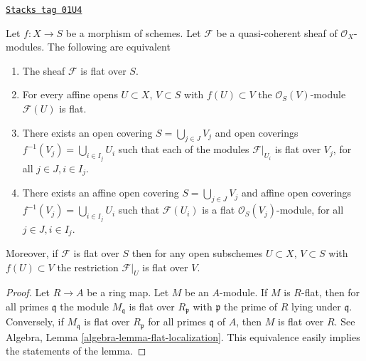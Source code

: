 \begin{lemma}
\label{morphisms-lemma-flat-module-characterize}
\href{https://stacks.math.columbia.edu/tag/01U4}{\texttt{Stacks tag 01U4}}

Let $f : X \to S$ be a morphism of schemes.
Let $\mathcal{F}$ be a quasi-coherent sheaf of $\mathcal{O}_X$-modules.
The following are equivalent
\begin{enumerate}
\item The sheaf $\mathcal{F}$ is flat over $S$.
\item For every affine opens $U \subset X$, $V \subset S$
with $f(U) \subset V$ the $\mathcal{O}_S(V)$-module $\mathcal{F}(U)$ is flat.
\item There exists an open covering $S = \bigcup_{j \in J} V_j$
and open coverings $f^{-1}(V_j) = \bigcup_{i \in I_j} U_i$ such
that each of the modules $\mathcal{F}|_{U_i}$ is
flat over $V_j$, for all $j\in J, i\in I_j$.
\item There exists an affine open covering $S = \bigcup_{j \in J} V_j$
and affine open coverings $f^{-1}(V_j) = \bigcup_{i \in I_j} U_i$ such
that $\mathcal{F}(U_i)$ is a flat $\mathcal{O}_S(V_j)$-module, for all
$j\in J, i\in I_j$.
\end{enumerate}
Moreover, if $\mathcal{F}$ is flat over $S$ then for
any open subschemes $U \subset X$, $V \subset S$ with $f(U) \subset V$
the restriction $\mathcal{F}|_U$ is flat over $V$.
\end{lemma}

\begin{proof}
Let $R \to A$ be a ring map. Let $M$ be an $A$-module.
If $M$ is $R$-flat, then for all primes
$\mathfrak q$ the module $M_{\mathfrak q}$ is flat over $R_{\mathfrak p}$
with $\mathfrak p$ the prime of $R$ lying under $\mathfrak q$. Conversely, if
$M_{\mathfrak q}$ is flat over $R_{\mathfrak p}$ for all primes $\mathfrak q$
of $A$, then $M$ is flat over $R$. See
Algebra, Lemma \ref{algebra-lemma-flat-localization}.
This equivalence easily implies the statements of the lemma.
\end{proof}

